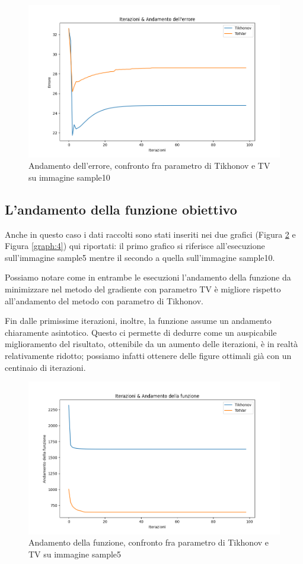 \documentclass[12pt]{article}
\begin{document}
    \begin{figure}[h!]
    \centering
    \includegraphics[width=12cm]{errors-sample10}
    \caption{Andamento dell'errore, confronto fra parametro di Tikhonov e TV su immagine sample10}
    \label{graph:2}
    \end{figure}

    \newpage
    \subsection{L'andamento della funzione obiettivo}
    Anche in questo caso i dati raccolti sono stati inseriti nei due grafici (Figura \ref{graph:3} e Figura \ref{graph:4}) qui riportati: il primo grafico si riferisce all'esecuzione sull'immagine sample5 mentre il secondo a quella sull'immagine sample10.

    Possiamo notare come in entrambe le esecuzioni l'andamento della funzione da minimizzare nel metodo del gradiente con parametro TV è migliore rispetto all'andamento del metodo con parametro di Tikhonov.

    Fin dalle primissime iterazioni, inoltre, la funzione assume un andamento chiaramente asintotico.
    Questo ci permette di dedurre come un auspicabile miglioramento del risultato,  ottenibile da un aumento delle iterazioni, è in realtà relativamente ridotto; possiamo infatti ottenere delle figure ottimali già con un centinaio di iterazioni.

    \begin{figure}[h!]
    \centering
    \includegraphics[width=12cm]{fun-sample5}
    \caption{Andamento della funzione, confronto fra parametro di Tikhonov e TV su immagine sample5}
    \label{graph:3}
    \end{figure}
\end{document}
